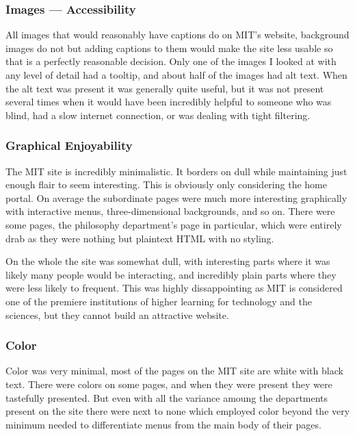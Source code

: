 \subsubsection*{Images --- Accessibility}

All images that would reasonably have captions do on MIT's website, background images do not but
adding captions to them would make the site less usable so that is a perfectly reasonable
decision. Only one of the images I looked at with any level of detail had a tooltip, and
about half of the images had alt text. When the alt text was present it was generally quite
useful, but it was not present several times when it would have been incredibly helpful to
someone who was blind, had a slow internet connection, or was dealing with tight filtering.

\subsubsection*{Graphical Enjoyability}

The MIT site is incredibly minimalistic. It borders on dull while maintaining just enough flair
to seem interesting. This is obviously only considering the home portal. On average the
subordinate pages were much more interesting graphically with interactive menus,
three-dimensional backgrounds, and so on. There were some pages, the philosophy department's
page in particular, which were entirely drab as they were nothing but plaintext HTML with no
styling. 

On the whole the site was somewhat dull, with interesting parts where it was likely many
people would be interacting, and incredibly plain parts where they were less likely to
frequent. This was highly dissappointing as MIT is considered one of the premiere
institutions of higher learning for technology and the sciences, but they cannot build an
attractive website.

\subsubsection*{Color}

Color was very minimal, most of the pages on the MIT site are white with black text. There
were colors on some pages, and when they were present they were tastefully presented. But
even with all the variance amoung the departments present on the site there were next to none
which employed color beyond the very minimum needed to differentiate menus from the main
body of their pages.

